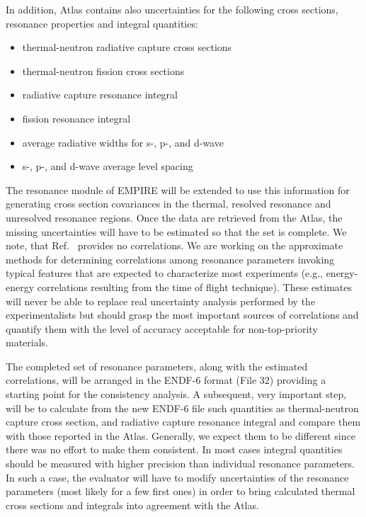 In addition, Atlas contains also uncertainties for the following cross
sections, resonance properties and integral quantities:

\begin{itemize}
\item thermal-neutron radiative capture cross sections

\item thermal-neutron fission cross sections

\item radiative capture resonance integral

\item fission resonance integral

\item average radiative widths for s-, p-, and d-wave

\item s-, p-, and d-wave average level spacing
\end{itemize}

The resonance module of EMPIRE will be extended to use this information for
generating cross section covariances in the thermal, resolved resonance and
unresolved resonance regions. Once the data are retrieved from the Atlas,
the missing uncertainties will have to be estimated so that the set is
complete. We note, that Ref.~\cite{Mughabghab:06} provides no correlations.
We are working on the approximate methods for determining correlations among
resonance parameters invoking typical features that are expected to
characterize most experiments (e.g., energy-energy correlations resulting
from the time of flight technique). These estimates will never be able to
replace real uncertainty analysis performed by the experimentalists but
should grasp the most important sources of correlations and quantify them
with the level of accuracy acceptable for non-top-priority materials.

The completed set of resonance parameters, along with the estimated
correlations, will be arranged in the ENDF-6 format (File 32) providing a
starting point for the consistency analysis. A subsequent, very important
step, will be to calculate from the new ENDF-6 file such quantities as
thermal-neutron capture cross section, and radiative capture resonance
integral and compare them with those reported in the Atlas. Generally, we
expect them to be different since there was no effort to make them
consistent. In most cases integral quantities should be measured with higher
precision than individual resonance parameters. In such a case, the
evaluator will have to modify uncertainties of the resonance parameters
(most likely for a few first ones) in order to bring calculated thermal
cross sections and integrals into agreement with the Atlas.

